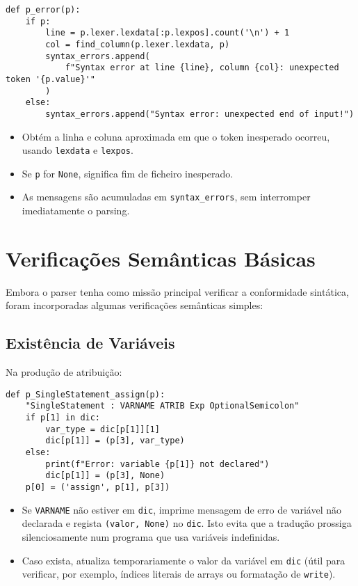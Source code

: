 \begin{verbatim}
def p_error(p):
    if p:
        line = p.lexer.lexdata[:p.lexpos].count('\n') + 1
        col = find_column(p.lexer.lexdata, p)
        syntax_errors.append(
            f"Syntax error at line {line}, column {col}: unexpected token '{p.value}'"
        )
    else:
        syntax_errors.append("Syntax error: unexpected end of input!")
\end{verbatim}

\noindent

\begin{itemize}
    \item Obtém a linha e coluna aproximada em que o token inesperado ocorreu, usando \texttt{lexdata} e \texttt{lexpos}.
    \item Se \texttt{p} for \texttt{None}, significa fim de ficheiro inesperado.
    \item As mensagens são acumuladas em \texttt{syntax\_errors}, sem interromper imediatamente o parsing.
\end{itemize}

\section{Verificações Semânticas Básicas}
\label{sec:verificacoes}

Embora o parser tenha como missão principal verificar a conformidade sintática, foram incorporadas algumas verificações semânticas simples:

\subsection{Existência de Variáveis}

Na produção de atribuição:

\begin{verbatim}
def p_SingleStatement_assign(p):
    "SingleStatement : VARNAME ATRIB Exp OptionalSemicolon"
    if p[1] in dic:
        var_type = dic[p[1]][1]
        dic[p[1]] = (p[3], var_type)
    else:
        print(f"Error: variable {p[1]} not declared")
        dic[p[1]] = (p[3], None)
    p[0] = ('assign', p[1], p[3])
\end{verbatim}

\noindent

\begin{itemize}
    \item Se \texttt{VARNAME} não estiver em \texttt{dic}, imprime mensagem de erro de variável não declarada e regista \texttt{(valor, None)} no \texttt{dic}. Isto evita que a tradução prossiga silenciosamente num programa que usa variáveis indefinidas.
    \item Caso exista, atualiza temporariamente o valor da variável em \texttt{dic} (útil para verificar, por exemplo, índices literais de arrays ou formatação de \texttt{write}).
\end{itemize}

